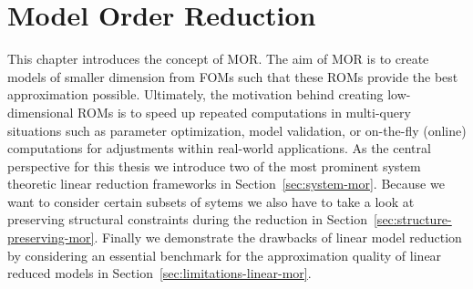 \chapter{Model Order Reduction}\label{chap:linear-mor}

This chapter introduces the concept of \ac{MOR}.
The aim of MOR is to create models of smaller dimension from \acp{FOM} such that these \acp{ROM} provide the best approximation possible.
Ultimately, the motivation behind creating low-dimensional ROMs is to speed up repeated computations in multi-query situations such as parameter optimization, model validation, or on-the-fly (online) computations for adjustments within real-world applications.
As the central perspective for this thesis we introduce two of the most prominent system theoretic linear reduction frameworks in Section~\ref{sec:system-mor}.
Because we want to consider certain subsets of sytems we also have to take a look at preserving structural constraints during the reduction in Section~\ref{sec:structure-preserving-mor}.
Finally we demonstrate the drawbacks of linear model reduction by considering an essential benchmark for the approximation quality of linear reduced models in Section~\ref{sec:limitations-linear-mor}.





